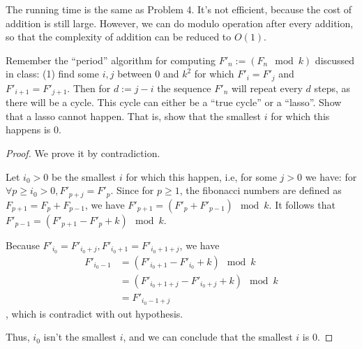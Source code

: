 \documentclass[UTF8, a4paper, linespread=1.5]{article}
\begin{document}
The running time is the same as Problem 4. It's not efficient, because the cost of addition is still large. However, we can do modulo operation after every addition, so that the complexity of addition can be reduced to $O(1)$.

\begin{thm}{}{}
    Remember the ``period'' algorithm for computing $F'_n := (F_n \mod k)$ discussed in class: (1) find some $i,j$ between $0$ and $k^2$ for which $F'_{i} =  F'_{j}$ and $F'_{i+1} = F'_{j+1}$. Then for $d := j-i$ the sequence $F'_{n}$ will repeat every $d$ steps, as there will be a cycle. This cycle can either be a ``true cycle'' or a ``lasso''. Show that a lasso cannot happen. That is, show that the smallest $i$ for which this happens is $0$.
\end{thm}

\begin{proof}
    We prove it by contradiction.
    
    Let $i_0 > 0$ be the smallest $i$ for which this happen, i.e, for some $j > 0$ we have: for $\forall p \geqslant i_0 > 0, F'_{p + j} = F'_p$. Since for $p \geqslant 1$, the fibonacci numbers are defined as $F_{p + 1} = F_{p} + F_{p - 1}$, we have $F'_{p + 1} = (F'_p + F'_{p - 1}) \mod k$. It follows that $F'_{p - 1} = (F'_{p + 1} - F'_p + k) \mod k$.
    
    Because $F'_{i_0} = F'_{i_0 + j}, F'_{i_0 + 1} = F'_{i_0 + 1 + j}$, we have
    \begin{align*}
        F'_{i_0 - 1} &= (F'_{i_0 + 1} - F'_{i_0} + k) \mod k \\
        &= (F'_{i_0 + 1 + j} - F'_{i_0 + j} + k) \mod k \\
        &= F'_{i_0 - 1 + j}
    \end{align*}
    , which is contradict with out hypothesis.
    
    Thus, $i_0$ isn't the smallest $i$, and we can conclude that the smallest $i$ is $0$.
\end{proof}
\end{document}
